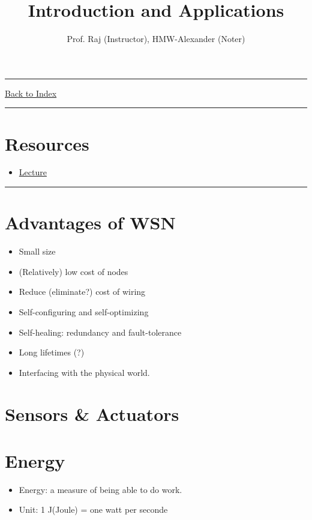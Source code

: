 \documentclass[letterpaper,10pt]{article}
\title{\textbf{Introduction and Applications}}
\author{Prof. Raj (Instructor), HMW-Alexander (Noter)}
\newcommand{\panhline}{\begin{center}\rule{\textwidth}{1pt}\end{center}}
\begin{document}
\maketitle

\panhline
\href{../index.html}{Back to Index}

\panhline
\tableofcontents

\section*{Resources}

\begin{itemize}
	\item \href{../../Lectures/LectureFile.pdf}{Lecture}
\end{itemize}

\panhline

\section{Advantages of WSN}

\begin{itemize}
	\item Small size
	\item (Relatively) low cost of nodes
	\item Reduce (eliminate?) cost of wiring
	\item Self-configuring and self-optimizing
	\item Self-healing: redundancy and fault-tolerance
	\item Long lifetimes (?)
	\item Interfacing with the physical world.
\end{itemize}
	
\section{Sensors \& Actuators}


\section{Energy}

\begin{itemize}
	\item Energy: a measure of being able to do work.
	\item Unit: 1 J(Joule) = one watt per seconde
\end{itemize}
\end{document}
